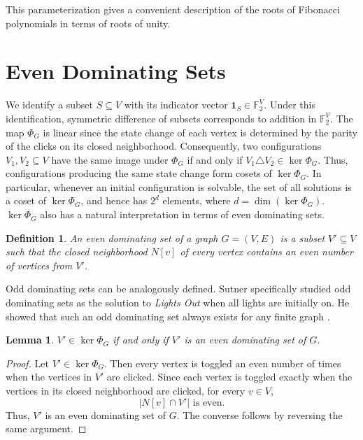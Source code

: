 \documentclass[a4paper]{article}
\newtheorem{lemma}[theorem]{Lemma}
\newtheorem{definition}[theorem]{Definition}
\newcommand{\F}{\mathbb{F}}
\newcommand{\abs}[1]{\left| #1 \right|}
\renewcommand{\dim}[1]{\operatorname{dim}\!\left( #1 \right)}
\begin{document}
	This parameterization gives a convenient description of the roots of Fibonacci polynomials in terms of roots of unity.

	\section{Even Dominating Sets}
	We identify a subset $S \subseteq V$ with its indicator vector $\mathbf{1}_{S} \in \F_2^V$.
	Under this identification, symmetric difference of subsets corresponds to addition in $\F_2^V$.
	The map $\Phi_G$ is linear since the state change of each vertex is determined by the parity of the clicks on its closed neighborhood.
	Consequently, two configurations $V_1, V_2 \subseteq V$ have the same image under $\Phi_G$ if and only if $V_1 \triangle V_2 \in \ker{\Phi_G}$.
	Thus, configurations producing the same state change form cosets of $\ker{\Phi_G}$.
	In particular, whenever an initial configuration is solvable, the set of all solutions is a coset of $\ker{\Phi_G}$, and hence has $2^d$ elements, where $d = \dim{\ker{\Phi_G}}$.
	$\ker{\Phi_G}$ also has a natural interpretation in terms of even dominating sets.
	
	\begin{definition}
		An \textit{even dominating set} of a graph $G = (V,E)$ is a subset $V' \subseteq V$ such that the closed neighborhood $N[v]$ of every vertex contains an even number of vertices from $V'$. 
	\end{definition}
	Odd dominating sets can be analogously defined.
	Sutner specifically studied odd dominating sets as the solution to \textit{Lights Out} when all lights are initially on.
	He showed that such an odd dominating set always exists for any finite graph \cite{Sutner1989}.
	
	\begin{lemma}
		$V' \in \ker{\Phi_G}$ if and only if $V'$ is an even dominating set of $G$.
	\end{lemma}
	\begin{proof}
		Let $V' \in \ker{\Phi_G}$.
		Then every vertex is toggled an even number of times when the vertices in $V'$ are clicked.
		Since each vertex is toggled exactly when the vertices in its closed neighborhood are clicked, for every $v \in V$,
		\begin{equation*}
			\abs{N[v] \cap V'} \text{ is even}.
		\end{equation*}
		Thus, $V'$ is an even dominating set of $G$.
		The converse follows by reversing the same argument.
	\end{proof}
\end{document}
